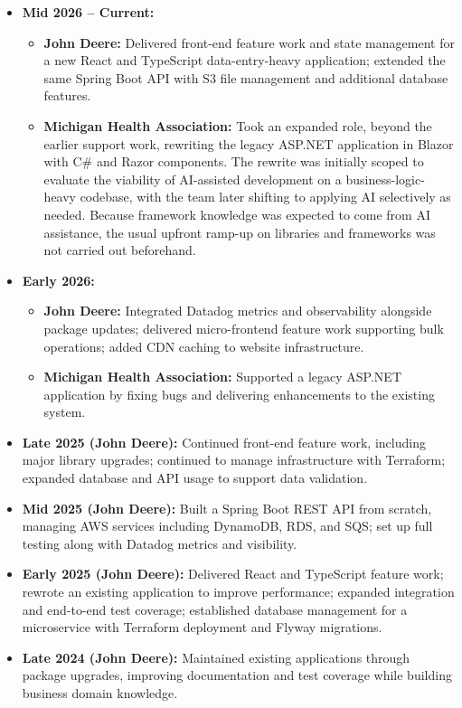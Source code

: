 \documentclass[11pt,letterpaper]{article}
\begin{document}
\begin{itemize}
  \item \textbf{Mid 2026 -- Current:}
    \begin{itemize}
      \item \textbf{John Deere:} Delivered front-end feature work and state
        management for a new React and TypeScript data-entry-heavy application;
        extended the same Spring Boot API with S3 file management and additional
        database features.
      \item \textbf{Michigan Health Association:} Took an expanded role, beyond
        the earlier support work, rewriting the legacy ASP.NET application in
        Blazor with C\# and Razor components. The rewrite was initially scoped to
        evaluate the viability of AI-assisted development on a
        business-logic-heavy codebase, with the team later shifting to applying
        AI selectively as needed. Because framework knowledge was expected to
        come from AI assistance, the usual upfront ramp-up on libraries and
        frameworks was not carried out beforehand.
    \end{itemize}
  \item \textbf{Early 2026:}
    \begin{itemize}
      \item \textbf{John Deere:} Integrated Datadog metrics and observability
        alongside package updates; delivered micro-frontend feature work
        supporting bulk operations; added CDN caching to website infrastructure.
      \item \textbf{Michigan Health Association:} Supported a legacy ASP.NET
        application by fixing bugs and delivering enhancements to the
        existing system.
    \end{itemize}
  \item \textbf{Late 2025 (John Deere):} Continued front-end feature work,
    including major library upgrades; continued to manage infrastructure with
    Terraform; expanded database and API usage to support data validation.
  \item \textbf{Mid 2025 (John Deere):} Built a Spring Boot REST API from
    scratch, managing AWS services including DynamoDB, RDS, and SQS; set up full
    testing along with Datadog metrics and visibility.
  \item \textbf{Early 2025 (John Deere):} Delivered React and TypeScript
    feature work; rewrote an existing application to improve performance;
    expanded integration and end-to-end test coverage; established database
    management for a microservice with Terraform deployment and Flyway
    migrations.
  \item \textbf{Late 2024 (John Deere):} Maintained existing applications
    through package upgrades, improving documentation and test coverage while
    building business domain knowledge.
\end{itemize}
\end{document}
